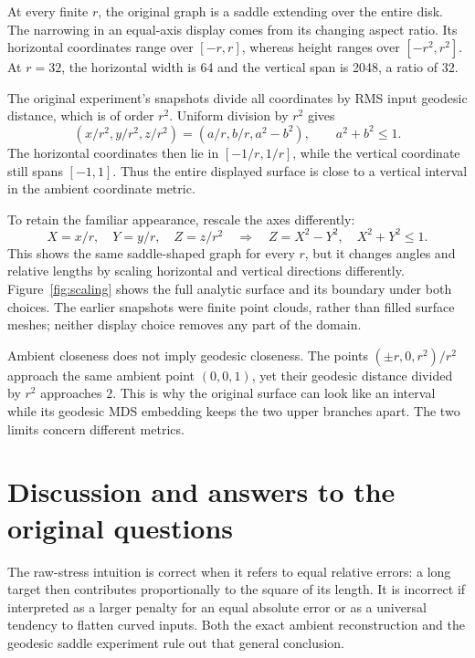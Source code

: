 \documentclass[11pt]{article}
\theoremstyle{remark}\newtheorem{remark}[proposition]{Remark}
\begin{document}
At every finite $r$, the original graph is a saddle extending over the entire
disk. The narrowing in an equal-axis display comes from its changing aspect
ratio. Its horizontal coordinates range over $[-r,r]$, whereas height ranges
over $[-r^2,r^2]$. At $r=32$, the horizontal width is 64 and the vertical span
is 2048, a ratio of 32.

The original experiment's snapshots divide all coordinates by RMS input
geodesic distance, which is of order $r^2$. Uniform division by $r^2$ gives
\begin{equation}
 (x/r^2,y/r^2,z/r^2)=(a/r,b/r,a^2-b^2),
 \qquad a^2+b^2\le1.
\end{equation}
The horizontal coordinates then lie in $[-1/r,1/r]$, while the vertical
coordinate still spans $[-1,1]$. Thus the entire displayed surface is close
to a vertical interval in the ambient coordinate metric.

To retain the familiar appearance, rescale the axes differently:
\begin{equation}
 X=x/r,\quad Y=y/r,\quad Z=z/r^2
 \quad\Longrightarrow\quad
 Z=X^2-Y^2,\quad X^2+Y^2\le1.
\end{equation}
This shows the same saddle-shaped graph for every $r$, but it changes angles
and relative lengths by scaling horizontal and vertical directions differently.
Figure~\ref{fig:scaling} shows the full analytic surface and its boundary under
both choices. The earlier snapshots were finite point clouds, rather than
filled surface meshes; neither display choice removes any part of the domain.

Ambient closeness does not imply geodesic closeness. The points
$(\pm r,0,r^2)/r^2$ approach the same ambient point $(0,0,1)$, yet their
geodesic distance divided by $r^2$ approaches $2$. This is why the original
surface can look like an interval while its geodesic MDS embedding keeps
the two upper branches apart. The two limits concern different metrics.

\section{Discussion and answers to the original questions}\label{sec:discussion}

The raw-stress intuition is correct when it refers to equal relative errors:
a long target then contributes proportionally to the square of its length.
It is incorrect if interpreted as a larger penalty for an equal absolute
error or as a universal tendency to flatten curved inputs. Both the exact
ambient reconstruction and the geodesic saddle experiment rule out that
general conclusion.
\end{document}
